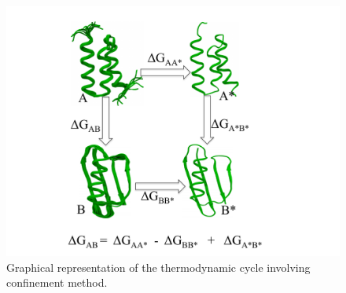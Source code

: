 \documentclass[12pt]{article}
\begin{document}


\begin{figure}
\begin{center}
\includegraphics[width=3.5 in,height=3.5 in]{method.pdf}
\end{center}
\caption{Graphical representation of the thermodynamic cycle involving confinement method.}
\label{fig:method}
\end{figure}

\end{document}
